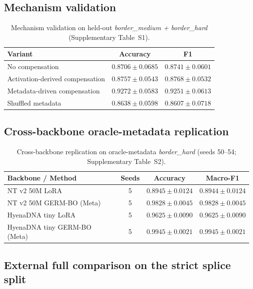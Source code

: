 \documentclass[11pt,a4paper]{article}
\newcommand{\splitname}[1]{\textit{#1}}
\begin{document}
\subsection{Mechanism validation}

\begin{table}[htbp]
\centering
\caption{Mechanism validation on held-out \splitname{border\_medium + border\_hard} (Supplementary Table~S1).}
\label{tab:mechanism-main}
\small
\begin{tabular}{lcc}
\toprule
Variant & Accuracy & F1 \\
\midrule
No compensation & $0.8706 \pm 0.0685$ & $0.8741 \pm 0.0601$ \\
Activation-derived compensation & $0.8757 \pm 0.0543$ & $0.8768 \pm 0.0532$ \\
Metadata-driven compensation & $\mathbf{0.9272 \pm 0.0583}$ & $\mathbf{0.9251 \pm 0.0613}$ \\
Shuffled metadata & $0.8638 \pm 0.0598$ & $0.8607 \pm 0.0718$ \\
\bottomrule
\end{tabular}
\end{table}

\subsection{Cross-backbone oracle-metadata replication}

\begin{table}[htbp]
\centering
\caption{Cross-backbone replication on oracle-metadata \splitname{border\_hard} (seeds 50--54; Supplementary Table~S2).}
\label{tab:cross-backbone-oracle}
\small
\begin{tabular}{lccc}
\toprule
Backbone / Method & Seeds & Accuracy & Macro-F1 \\
\midrule
NT v2 50M LoRA & 5 & $0.8945 \pm 0.0124$ & $0.8944 \pm 0.0124$ \\
NT v2 50M GERM-BO (Meta) & 5 & $\mathbf{0.9828 \pm 0.0045}$ & $\mathbf{0.9828 \pm 0.0045}$ \\
HyenaDNA tiny LoRA & 5 & $0.9625 \pm 0.0090$ & $0.9625 \pm 0.0090$ \\
HyenaDNA tiny GERM-BO (Meta) & 5 & $\mathbf{0.9945 \pm 0.0021}$ & $\mathbf{0.9945 \pm 0.0021}$ \\
\bottomrule
\end{tabular}
\end{table}

\subsection{External full comparison on the strict splice split}
\end{document}
